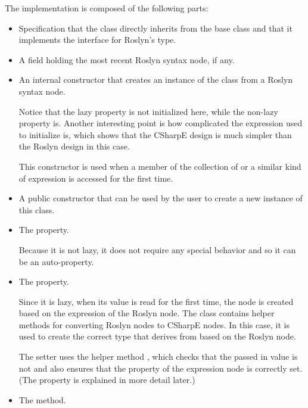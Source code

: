 The implementation is composed of the following parts:

\begin{itemize}
\item Specification that the class directly inherits from the  base class and that it implements the  interface for Roslyn's  type.

\item A field holding the most recent Roslyn syntax node, if any.

\item An internal constructor that creates an instance of the class from a Roslyn syntax node.

Notice that the lazy property  is not initialized here, while the non-lazy property  is. Another interesting point is how complicated the expression used to initialize  is, which shows that the CSharpE design is much simpler than the Roslyn design in this case.

This constructor is used when a member of the  collection of  or a similar kind of expression is accessed for the first time.

\item A public constructor that can be used by the user to create a new instance of this class.

\item The  property.

Because it is not lazy, it does not require any special behavior and so it can be an auto-property.

\item The  property.

Since it is lazy, when its value is read for the first time, the  node is created based on the expression of the Roslyn node. The  class contains helper methods for converting Roslyn nodes to CSharpE nodes. In this case, it is used to create the correct type that derives from  based on the Roslyn node.

The setter uses the helper method , which checks that the passed in value is not  and also ensures that the  property of the expression node is correctly set. (The  property is explained in more detail later.)

\item The  method.


\end{itemize}
